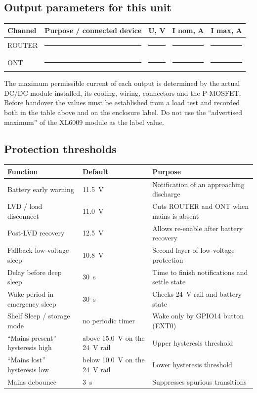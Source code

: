 \documentclass[11pt,a4paper]{article}
\begin{document}
\subsection{Output parameters for this unit}
\begin{tabularx}{\textwidth}{@{}lXccc@{}}
\toprule
\textbf{Channel} & \textbf{Purpose / connected device} & \textbf{U, V} & \textbf{I nom, A} & \textbf{I max, A} \\
\midrule
ROUTER & \rule{45mm}{0.4pt} & \rule{12mm}{0.4pt} & \rule{12mm}{0.4pt} & \rule{12mm}{0.4pt} \\
ONT & \rule{45mm}{0.4pt} & \rule{12mm}{0.4pt} & \rule{12mm}{0.4pt} & \rule{12mm}{0.4pt} \\
\bottomrule
\end{tabularx}

\begin{tcolorbox}[colback=lightaccent,colframe=accent,title=Note on output current]
The maximum permissible current of each output is determined by the actual DC/DC module installed, its cooling, wiring, connectors and the P-MOSFET. Before handover the values must be established from a load test and recorded both in the table above and on the enclosure label. Do not use the ``advertised maximum'' of the XL6009 module as the label value.
\end{tcolorbox}

\subsection{Protection thresholds}
\begin{tabularx}{\textwidth}{@{}XlX@{}}
\toprule
\textbf{Function} & \textbf{Default} & \textbf{Purpose} \\
\midrule
Battery early warning & 11.5~V & Notification of an approaching discharge \\
LVD / load disconnect & 11.0~V & Cuts ROUTER and ONT when mains is absent \\
Post-LVD recovery & 12.5~V & Allows re-enable after battery recovery \\
Fallback low-voltage sleep & 10.8~V & Second layer of low-voltage protection \\
Delay before deep sleep & 30~s & Time to finish notifications and settle state \\
Wake period in emergency sleep & 30~s & Checks 24~V rail and battery state \\
Shelf Sleep / storage mode & no periodic timer & Wake only by GPIO14 button (EXT0) \\
``Mains present'' hysteresis high & above 15.0~V on the 24~V rail & Upper hysteresis threshold \\
``Mains lost'' hysteresis low & below 10.0~V on the 24~V rail & Lower hysteresis threshold \\
Mains debounce & 3~s & Suppresses spurious transitions \\
\bottomrule
\end{tabularx}
\end{document}
